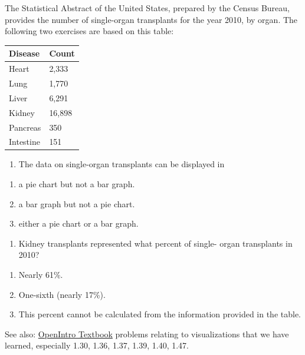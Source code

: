 \documentclass[
  letterpaper,
  DIV=11,
  numbers=noendperiod,
  oneside]{scrreprt}
\providecommand{\tightlist}{%
  \setlength{\itemsep}{0pt}\setlength{\parskip}{0pt}}\usepackage{longtable,booktabs,array}
\begin{document}
The Statistical Abstract of the United States, prepared by the Census
Bureau, provides the number of single-organ transplants for the year
2010, by organ. The following two exercises are based on this table:

\begin{longtable}[]{@{}ll@{}}
\toprule\noalign{}
Disease & Count \\
\midrule\noalign{}
\endhead
\bottomrule\noalign{}
\endlastfoot
Heart & 2,333 \\
Lung & 1,770 \\
Liver & 6,291 \\
Kidney & 16,898 \\
Pancreas & 350 \\
Intestine & 151 \\
\end{longtable}

\begin{enumerate}
\def\labelenumi{\arabic{enumi}.}
\setcounter{enumi}{2}
\tightlist
\item
  The data on single-organ transplants can be displayed in
\end{enumerate}

\begin{enumerate}
\def\labelenumi{\alph{enumi}.}
\tightlist
\item
  a pie chart but not a bar graph.
\item
  a bar graph but not a pie chart.
\item
  either a pie chart or a bar graph.
\end{enumerate}

\begin{enumerate}
\def\labelenumi{\arabic{enumi}.}
\setcounter{enumi}{3}
\tightlist
\item
  Kidney transplants represented what percent of single- organ
  transplants in 2010?
\end{enumerate}

\begin{enumerate}
\def\labelenumi{\alph{enumi}.}
\tightlist
\item
  Nearly 61\%.
\item
  One-sixth (nearly 17\%).
\item
  This percent cannot be calculated from the information provided in the
  table.
\end{enumerate}

See also:
\href{https://stats.libretexts.org/Bookshelves/Introductory_Statistics/Book\%3A_OpenIntro_Statistics_(Diez_et_al)./01\%3A_Introduction_to_Data/1.E\%3A_Introduction_to_Data_(Exercises)}{OpenIntro
Textbook} problems relating to visualizations that we have learned,
especially 1.30, 1.36, 1.37, 1.39, 1.40, 1.47.
\end{document}
